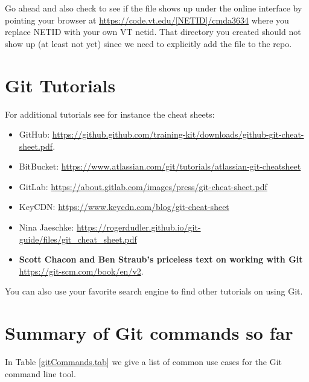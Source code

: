 Go ahead and also check to see if the file shows up under the online interface by pointing your browser at \href{https://code.vt.edu/[NETID]/cmda3634}{https://code.vt.edu/[NETID]/cmda3634} where you replace NETID  with your own VT netid. That directory you created should not show up (at least not yet) since we need to explicitly add the file to the repo.

\section{Git Tutorials}

For additional tutorials see for instance the cheat sheets:
\begin{itemize}
    \item GitHub: \href{https://github.github.com/training-kit/downloads/github-git-cheat-sheet.pdf}{https://github.github.com/training-kit/downloads/github-git-cheat-sheet.pdf}. 
    \item BitBucket:
    \href{https://www.atlassian.com/git/tutorials/atlassian-git-cheatsheet}{https://www.atlassian.com/git/tutorials/atlassian-git-cheatsheet}
    \item GitLab: \href{https://about.gitlab.com/images/press/git-cheat-sheet.pdf}{https://about.gitlab.com/images/press/git-cheat-sheet.pdf}
    \item KeyCDN: \href{https://www.keycdn.com/blog/git-cheat-sheet}{https://www.keycdn.com/blog/git-cheat-sheet}
    \item Nina Jaeschke: \href{https://rogerdudler.github.io/git-guide/files/git_cheat_sheet.pdf}{https://rogerdudler.github.io/git-guide/files/git\_cheat\_sheet.pdf}
    \item {\bf Scott Chacon and Ben Straub's priceless text on working with Git}\\ \href{https://git-scm.com/book/en/v2}{https://git-scm.com/book/en/v2}.
\end{itemize}

You can also use your favorite search engine to find other tutorials on using Git. 

\section{Summary of Git commands so far}

In Table \ref{gitCommands.tab} we give a list of common use cases for the Git command line tool. 

